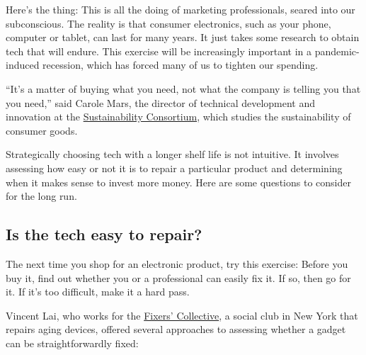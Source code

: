 Here's the thing: This is all the doing of marketing professionals,
seared into our subconscious. The reality is that consumer electronics,
such as your phone, computer or tablet, can last for many years. It just
takes some research to obtain tech that will endure. This exercise will
be increasingly important in a pandemic-induced recession, which has
forced many of us to tighten our spending.

``It's a matter of buying what you need, not what the company is telling
you that you need,'' said Carole Mars, the director of technical
development and innovation at the
\href{https://www.sustainabilityconsortium.org/}{Sustainability
Consortium}, which studies the sustainability of consumer goods.

Strategically choosing tech with a longer shelf life is not intuitive.
It involves assessing how easy or not it is to repair a particular
product and determining when it makes sense to invest more money. Here
are some questions to consider for the long run.

\hypertarget{is-the-tech-easy-to-repair}{%
\subsection{Is the tech easy to
repair?}\label{is-the-tech-easy-to-repair}}

The next time you shop for an electronic product, try this exercise:
Before you buy it, find out whether you or a professional can easily fix
it. If so, then go for it. If it's too difficult, make it a hard pass.

Vincent Lai, who works for the
\href{http://www.nytimes3xbfgragh.onion/2009/10/08/garden/08seen.html?module=inline}{Fixers'
Collective}, a social club in New York that repairs aging devices,
offered several approaches to assessing whether a gadget can be
straightforwardly fixed:

